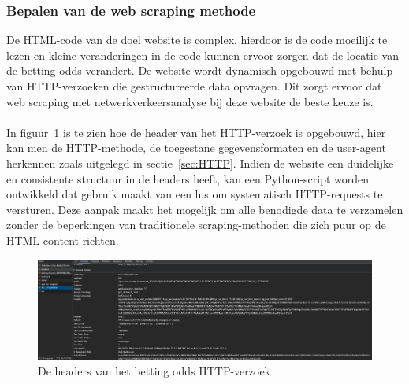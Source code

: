 \subsubsection{Bepalen van de web scraping methode}
De HTML-code van de doel website is complex, hierdoor is de code moeilijk te lezen en kleine veranderingen in de code kunnen ervoor zorgen dat de locatie van de betting odds verandert. De website wordt dynamisch opgebouwd met behulp van HTTP-verzoeken die gestructureerde data opvragen. Dit zorgt ervoor dat web scraping met netwerkverkeersanalyse bij deze website de beste keuze is.
\\
\\
In figuur~\ref{fig:networktab4} is te zien hoe de header van het HTTP-verzoek is opgebouwd, hier kan men de HTTP-methode, de toegestane gegevensformaten en de user-agent herkennen zoals uitgelegd in sectie~\ref{sec:HTTP}. Indien de website een duidelijke en consistente structuur in de headers heeft, kan een Python-script worden ontwikkeld dat gebruik maakt van een lus om systematisch HTTP-requests te versturen. Deze aanpak maakt het mogelijk om alle benodigde data te verzamelen zonder de beperkingen van traditionele scraping-methoden die zich puur op de HTML-content richten.
\begin{figure}[h]
    \centering
    \includegraphics[width=\linewidth]{graphics/headers.png}
    \caption{De headers van het betting odds HTTP-verzoek}
    \label{fig:networktab4}
\end{figure}


